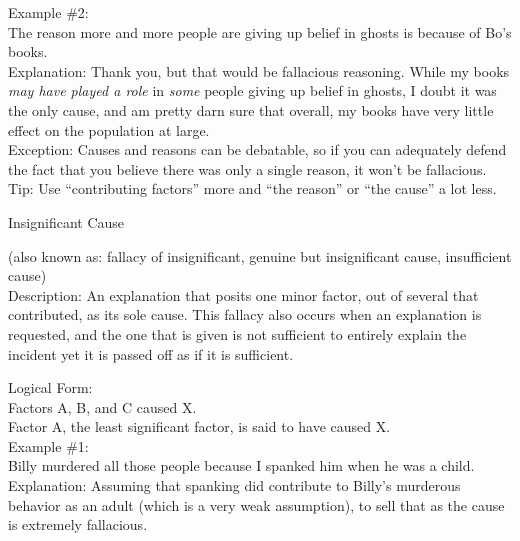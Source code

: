 \documentclass[a4paper,12pt,single,pdftex]{scrbook}
\begin{document}
{    
      Example \#2:
    \\

    
      The reason more and more people are giving up belief in ghosts is because of Bo’s books.
    \\

    
      Explanation: Thank you, but that would be fallacious reasoning.  While my books {\it may have played a role} in {\it some} people giving up belief in ghosts, I doubt it was the only cause, and am pretty darn sure that overall, my books have very little effect on the population at large.
    \\

    
      Exception: Causes and reasons can be debatable, so if you can adequately defend the fact that you believe there was only a single reason, it won’t be fallacious.
    \\

    
      Tip: Use “contributing factors” more and “the reason” or “the cause” a lot less.
    \\

  }


Insignificant Cause
    
      (also known as: fallacy of insignificant, genuine but insignificant cause, insufficient cause)
    \\

  
    Description: An explanation that posits one minor factor, out of several that contributed, as its sole cause. This fallacy also occurs when an explanation is requested, and the one that is given is not sufficient to entirely explain the incident yet it is passed off as if it is sufficient.

    
      Logical Form:
    \\

    
      Factors A, B, and C caused X.
    \\

    
      Factor A, the least significant factor, is said to have caused X.
    \\

    
      Example \#1:
    \\

    
      Billy murdered all those people because I spanked him when he was a child.
    \\

    
      Explanation: Assuming that spanking did contribute to Billy's murderous behavior as an adult (which is a very weak assumption), to sell that as the cause is extremely fallacious.
    \\
\end{document}
